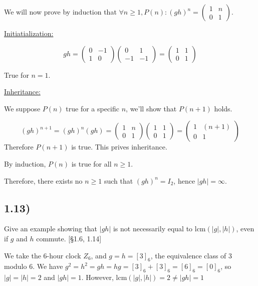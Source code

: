 \documentclass[12pt, letterpaper, twoside]{report}
\begin{document}
We will now prove by induction that $\forall n \geq 1, P(n): (gh)^n = \begin{pmatrix} 1 & n \\ 0 & 1 \end{pmatrix}$.

\underline{Initiatialization:}

$$
gh = \begin{pmatrix} 0 & -1 \\ 1 & 0 \end{pmatrix} \begin{pmatrix} 0 & 1 \\ -1 & -1 \end{pmatrix}
   = \begin{pmatrix} 1 & 1 \\ 0 & 1 \end{pmatrix}
$$

True for $n = 1$.

\underline{Inheritance:}

We suppose $P(n)$ true for a specific $n$, we'll show that $P(n+1)$ holds.

$$
(gh)^{n+1} = (gh)^n(gh)
       = \begin{pmatrix} 1 & n \\ 0 & 1 \end{pmatrix} \begin{pmatrix} 1 & 1 \\ 0 & 1 \end{pmatrix}
	   = \begin{pmatrix} 1 & (n+1) \\ 0 & 1 \end{pmatrix}
$$
Therefore $P(n+1)$ is true. This prives inheritance.

By induction, $P(n)$ is true for all $n \geq 1$.

Therefore, there exists no $n \geq 1$ such that $(gh)^n = I_2$, hence $|gh| = \infty$.



\subsection*{1.13)}

Give an example showing that $|gh|$ is not necessarily equal to $\text{lcm}(|g|, |h|)$, even if $g$ and $h$ commute. [§1.6, 1.14]

We take the 6-hour clock $Z_6$, and $g = h = [3]_6$, the equivalence class of 3 modulo 6.  We have $g^2 = h^2 = gh = hg = [3]_6 + [3]_6 = [6]_6 = [0]_6$, so $|g| = |h| = 2$ and $|gh| = 1$. However, $\text{lcm}(|g|, |h|) = 2 \ne |gh| = 1$
\end{document}
